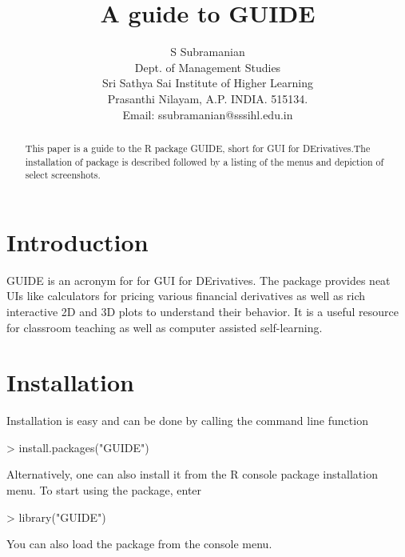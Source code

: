 \documentclass{article}
\begin{document}



\author{S Subramanian\\
Dept. of Management Studies\\ Sri Sathya Sai Institute of Higher Learning\\ Prasanthi Nilayam, A.P. INDIA. 515134.\\
Email: ssubramanian@sssihl.edu.in\\} 
\title{A guide to GUIDE}


\maketitle

\begin{abstract}{
This paper is a guide to the R package GUIDE, short for GUI for DErivatives.The installation of package is described followed by a listing of the menus and depiction of select screenshots.}
\end{abstract}

\section{Introduction}
GUIDE is an acronym for for GUI for DErivatives. The package provides neat UIs like calculators for pricing various financial derivatives as well as rich interactive 2D and 3D plots to understand their behavior. It is a useful resource for classroom teaching as well as computer assisted self-learning. 

\section{Installation}
 Installation is easy and can be done by calling the command line function
\begin{Schunk}
\begin{Sinput}
> install.packages("GUIDE")
\end{Sinput}
\end{Schunk}

Alternatively, one can also install it from the R console package installation menu. To start using the package, enter 
\begin{Schunk}
\begin{Sinput}
> library("GUIDE")
\end{Sinput}
\end{Schunk}
You can also load the package from the console menu.
\end{document}
